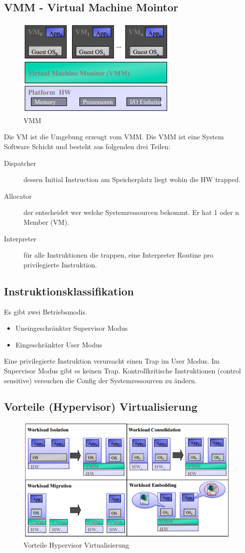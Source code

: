 \subsection{VMM - Virtual Machine Mointor}
\begin{figure}[h!]
	\centering
	\includegraphics[width=0.4\linewidth]{fig/vmm}
	\caption{VMM}
	\label{fig:vmm}
\end{figure}
Die VM ist die Umgebung erzeugt vom VMM. Die VMM ist eine System Software Schicht und besteht aus folgenden drei Teilen:
\begin{description}
	\item[Dispatcher] dessen Initial Instruction am Speicherplatz liegt wohin die HW trapped.
	\item[Allocator] der entscheidet wer welche Systemressourcen bekommt. Er hat 1 oder n Member (VM).
	\item[Interpreter] für alle Instruktionen die trappen, eine Interpreter Routine pro privilegierte Instruktion.
\end{description}

\subsection{Instruktionsklassifikation}
Es gibt zwei Betriebsmodis.
\begin{itemize}
	\item Uneingeschränkter Supervisor Modus
	\item Eingeschränkter User Modus
\end{itemize}
Eine privilegierte Instruktion verursacht einen Trap im User Modus. Im Supervisor Modus gibt es keinen Trap. Kontrollkritische Instruktionen (control sensitive) versuchen die Config der Systemressourcen zu ändern.

\subsection{Vorteile (Hypervisor) Virtualisierung}
\begin{figure}[h!]
\centering
\includegraphics[width=0.7\linewidth]{fig/vorteile-hypervisor-virtualisierung}
\caption{Vorteile Hypervisor Virtualisierung}
\label{fig:vorteile-hypervisor-virtualisierung}
\end{figure}

